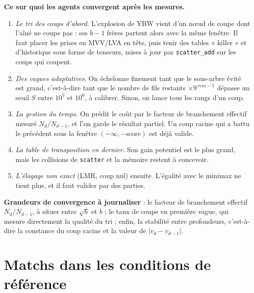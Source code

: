 \documentclass[11pt,a4paper]{article}
\newcommand{\code}[1]{\texttt{#1}}
\begin{document}
\noindent\textbf{Ce sur quoi les agents convergent après les mesures.}
\begin{enumerate}
\item \emph{Le tri des coups d'abord}. L'explosion de YBW vient d'un nœud de coupe dont l'aîné ne
coupe pas : ses $b-1$ frères partent alors avec la même fenêtre. Il faut placer les prises en
MVV/LVA en tête, puis tenir des tables « killer » et d'historique sous forme de tenseurs, mises à
jour par \code{scatter\_add} sur les coups qui coupent.
\item \emph{Des vagues adaptatives}. On échelonne finement tant que le sous-arbre évité est grand,
c'est-à-dire tant que le nombre de fils restants $\times 9^{\,rem-1}$ dépasse un seuil $S$ entre
$10^5$ et $10^6$, à calibrer. Sinon, on lance tous les rangs d'un coup.
\item \emph{La gestion du temps}. On prédit le coût par le facteur de branchement effectif mesuré
$N_d/N_{d-1}$, et l'on garde le résultat partiel. Un coup racine qui a battu le précédent sous la
fenêtre $(-\infty,-\text{score})$ est déjà valide.
\item \emph{La table de transposition en dernier}. Son gain potentiel est le plus grand, mais les
collisions de \code{scatter} et la mémoire restent à concevoir.
\item \emph{L'élagage non exact} (LMR, coup nul) ensuite. L'égalité avec le minimax ne tient
plus, et il faut valider par des parties.
\end{enumerate}

\noindent\textbf{Grandeurs de convergence à journaliser} : le facteur de branchement effectif
$N_d/N_{d-1}$, à situer entre $\sqrt b$ et $b$ ; le taux de coupe en première vague, qui mesure
directement la qualité du tri ; enfin, la stabilité entre profondeurs, c'est-à-dire la constance
du coup racine et la valeur de $|v_d-v_{d-1}|$.



\section{Matchs dans les conditions de référence}\label{sec:v4}

\end{document}

